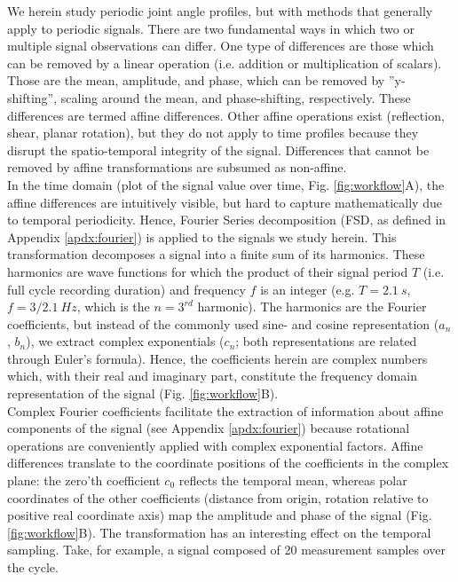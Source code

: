\documentclass[10pt, a4paper]{article}
\begin{document}
\begin{linenumbers}[1]
We herein study periodic joint angle profiles, but with methods that generally apply to periodic signals. 
There are two fundamental ways in which two or multiple signal observations can differ. 
One type of differences are those which can be removed by a linear operation (i.e. addition or multiplication of scalars). 
Those are the mean, amplitude, and phase, which can be removed by ''y-shifting'', scaling around the mean, and phase-shifting, respectively. 
These differences are termed affine differences. 
Other affine operations exist (reflection, shear, planar rotation), but they do not apply to time profiles because they disrupt the spatio-temporal integrity of the signal. 
Differences that cannot be removed by affine transformations are subsumed as non-affine. 
\\In the time domain (plot of the signal value over time, Fig. \ref{fig:workflow}A), the affine differences are intuitively visible, but hard to capture mathematically due to temporal periodicity. 
Hence, Fourier Series decomposition (FSD, as defined in Appendix \ref{apdx:fourier}) is applied to the signals we study herein. 
This transformation decomposes a signal into a finite sum of its harmonics. 
These harmonics are wave functions for which the product of their signal period $T$ (i.e. full cycle recording duration) and frequency $f$ is an integer (e.g. $T = 2.1\ s$, $f = 3/2.1\ Hz$, which is the $n=3^{rd}$ harmonic). 
The harmonics are the Fourier coefficients, but instead of the commonly used sine- and cosine representation ($a_{n}$, $b_{n}$), we extract complex exponentials ($c_{n}$; both representations are related through Euler's formula). 
Hence, the coefficients herein are complex numbers which, with their real and imaginary part, constitute the frequency domain representation of the signal (Fig. \ref{fig:workflow}B). 
\\Complex Fourier coefficients facilitate the extraction of information about affine components of the signal (see Appendix \ref{apdx:fourier}) because rotational operations are conveniently applied with complex exponential factors. 
Affine differences translate to the coordinate positions of the coefficients in the complex plane: the zero'th coefficient $c_{0}$ reflects the temporal mean, whereas polar coordinates of the other coefficients  (distance from origin, rotation relative to positive real coordinate axis) map the amplitude and phase of the signal (Fig. \ref{fig:workflow}B). 
The transformation has an interesting effect on the temporal sampling. 
Take, for example, a signal composed of 20 measurement samples over the cycle. 

\end{linenumbers}
\end{document}
